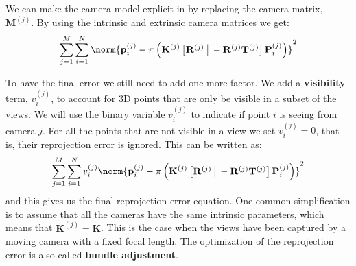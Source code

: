 We can make the camera model explicit in \eqn{\ref{eq:sfm:rep_error}} by replacing the camera matrix, $\mathbf{M}^{(j)}$. By using the intrinsic and extrinsic camera matrices we get:
\begin{equation}
    \sum_{j=1}^M \sum_{i=1}^N
    \norm{ \mathbf{p}^{(j)}_i - \pi \left( \mathbf{K}^{(j)}
        \begin{bmatrix}
            \mathbf{R}^{(j)} ~ \vline ~ -\mathbf{R}^{(j)}\mathbf{T}^{(j)}
        \end{bmatrix}
        \mathbf{P}^{(j)}_i \right)
    } ^2
\end{equation}

To have the final error we still need to add one more factor. We add a {\bf visibility} term, $v_i^{(j)}$, to account for 3D points that are only be visible in a subset of the views.  We will use the binary variable $v_i^{(j)}$ to indicate if point $i$ is seeing from camera $j$. For all the points that are not visible in a view we set $v_i^{(j)}=0$, that is, their reprojection error is ignored. This can be written as:
\begin{equation}
    \sum_{j=1}^M \sum_{i=1}^N
    v_i^{(j)}
    \norm{
        \mathbf{p}^{(j)}_i - \pi \left( \mathbf{K}^{(j)}
        \begin{bmatrix}
            \mathbf{R}^{(j)} ~ \vline ~ -\mathbf{R}^{(j)}\mathbf{T}^{(j)}
        \end{bmatrix}
        \mathbf{P}^{(j)}_i \right)
    } ^2
    \label{eq:final_reprojection_error}
\end{equation}
and this gives us the final reprojection error equation. One common simplification is to assume that all the cameras have the same intrinsic parameters, which means that $\mathbf{K}^{(j)}=\mathbf{K}$. This is the case when the views have been captured by a moving camera with a fixed focal length. The optimization of the reprojection error is also called {\bf bundle adjustment}.





